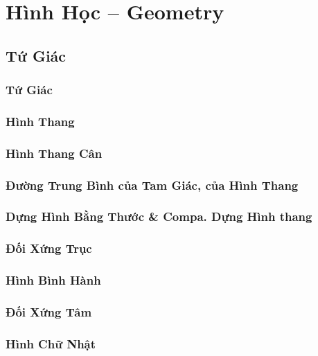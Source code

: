 \documentclass[oneside]{book}
\numberwithin{equation}{section}
\begin{document}

\part{Hình Học -- Geometry}

\chapter{Tứ Giác}

\section{Tứ Giác}

\section{Hình Thang}

\section{Hình Thang Cân}

\section{Đường Trung Bình của Tam Giác, của Hình Thang}

\section{Dựng Hình Bằng Thước \& Compa. Dựng Hình thang}

\section{Đối Xứng Trục}

\section{Hình Bình Hành}

\section{Đối Xứng Tâm}

\section{Hình Chữ Nhật}
\end{document}
